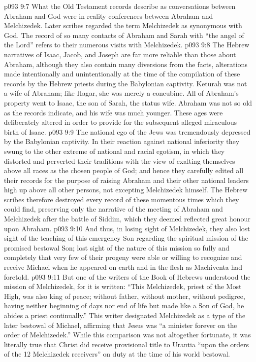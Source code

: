 \vs p093 9:7 What the Old Testament records describe as conversations between Abraham and God were in reality conferences between Abraham and Melchizedek. Later scribes regarded the term Melchizedek as synonymous with God. The record of so many contacts of Abraham and Sarah with “the angel of the Lord” refers to their numerous visits with Melchizedek.
\vs p093 9:8 The Hebrew narratives of Isaac, Jacob, and Joseph are far more reliable than those about Abraham, although they also contain many diversions from the facts, alterations made intentionally and unintentionally at the time of the compilation of these records by the Hebrew priests during the Babylonian captivity. Keturah was not a wife of Abraham; like Hagar, she was merely a concubine. All of Abraham’s property went to Isaac, the son of Sarah, the status wife. Abraham was not so old as the records indicate, and his wife was much younger. These ages were deliberately altered in order to provide for the subsequent alleged miraculous birth of Isaac.
\vs p093 9:9 \pc The national ego of the Jews was tremendously depressed by the Babylonian captivity. In their reaction against national inferiority they swung to the other extreme of national and racial egotism, in which they distorted and perverted their traditions with the view of exalting themselves above all races as the chosen people of God; and hence they carefully edited all their records for the purpose of raising Abraham and their other national leaders high up above all other persons, not excepting Melchizedek himself. The Hebrew scribes therefore destroyed every record of these momentous times which they could find, preserving only the narrative of the meeting of Abraham and Melchizedek after the battle of Siddim, which they deemed reflected great honour upon Abraham.
\vs p093 9:10 And thus, in losing sight of Melchizedek, they also lost sight of the teaching of this emergency Son regarding the spiritual mission of the promised bestowal Son; lost sight of the nature of this mission so fully and completely that very few of their progeny were able or willing to recognize and receive Michael when he appeared on earth and in the flesh as Machiventa had foretold.
\vs p093 9:11 But one of the writers of the Book of Hebrews understood the mission of Melchizedek, for it is written: “This Melchizedek, priest of the Most High, was also king of peace; without father, without mother, without pedigree, having neither beginning of days nor end of life but made like a Son of God, he abides a priest continually.” This writer designated Melchizedek as a type of the later bestowal of Michael, affirming that Jesus was “a minister forever on the order of Melchizedek.” While this comparison was not altogether fortunate, it was literally true that Christ did receive provisional title to Urantia “upon the orders of the 12 Melchizedek receivers” on duty at the time of his world bestowal.
